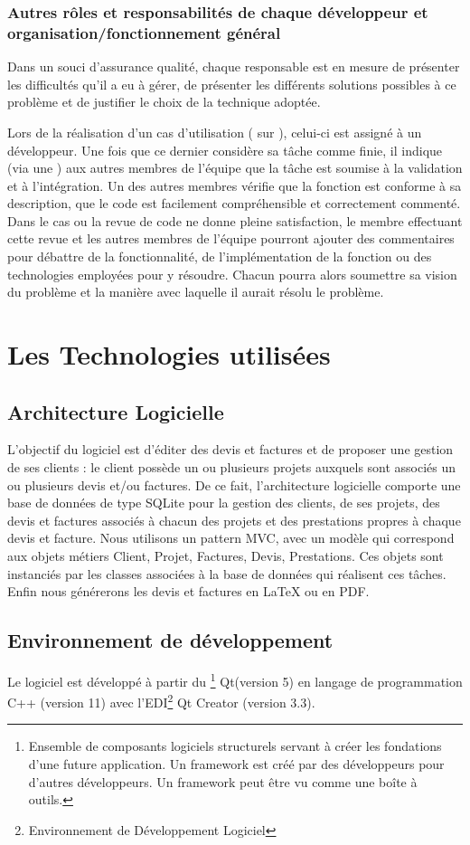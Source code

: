\subsubsection{Autres rôles et responsabilités de chaque développeur et organisation/fonctionnement général}
Dans un souci d’assurance qualité, chaque responsable est en mesure de présenter les difficultés qu'il a eu à gérer, de présenter les différents
solutions possibles à ce problème et de justifier le choix de la technique adoptée.

Lors de la réalisation d’un cas d’utilisation ( sur ), celui-ci est assigné à un développeur. Une fois que ce dernier considère sa
tâche comme finie, il indique (via une ) aux autres membres de l’équipe que la tâche est soumise à la validation et à l'intégration.
Un des autres membres vérifie que la fonction est conforme à sa description, que le code est facilement compréhensible et correctement commenté. Dans
le cas ou la revue de code ne donne pleine satisfaction, le membre effectuant cette revue et les autres membres de l’équipe pourront ajouter des
commentaires pour débattre de la fonctionnalité, de l’implémentation de la fonction ou des technologies employées pour y résoudre. Chacun pourra
alors soumettre sa vision du problème et la manière avec laquelle il aurait résolu le problème. 

\section{Les Technologies utilisées}
\subsection{Architecture Logicielle}
L’objectif du logiciel est d’éditer des devis et factures et de proposer une gestion de ses clients : le client possède un ou plusieurs projets auxquels sont associés un ou plusieurs devis et/ou factures. 
De ce fait, l’architecture logicielle comporte une base de données de type SQLite pour la gestion des clients, de ses projets, des devis et factures associés à chacun des projets et des prestations propres à chaque devis et facture. 
Nous utilisons un pattern MVC, avec un modèle qui correspond aux objets métiers Client, Projet, Factures, Devis, Prestations. Ces objets sont instanciés par les classes associées à la base de données qui réalisent ces tâches.
Enfin nous générerons les devis et factures en LaTeX ou en PDF.

\subsection{Environnement de développement}
Le logiciel est développé à partir du 
\footnote{Ensemble de composants logiciels structurels servant à créer les fondations d'une future application. Un framework est créé par des développeurs pour d'autres développeurs. Un framework peut être vu comme une boîte à outils.} 
Qt(version 5)
en langage de programmation C++ (version 11) avec l'EDI\footnote{Environnement de Développement Logiciel} Qt Creator (version 3.3). 


